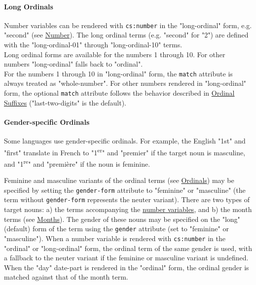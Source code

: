 \hypertarget{long-ordinals}{%
\paragraph{Long Ordinals}\label{long-ordinals}}

Number variables can be rendered with \texttt{cs:number} in the
"long-ordinal" form, e.g. "second" (see
\protect\hyperlink{number}{Number}). The long ordinal terms (e.g.
"second" for "2") are defined with the "long-ordinal-01" through
"long-ordinal-10" terms.\\
Long ordinal forms are available for the numbers 1 through 10. For other
numbers "long-ordinal" falls back to "ordinal".\\
For the numbers 1 through 10 in "long-ordinal" form, the \texttt{match}
attribute is always treated as "whole-number". For other numbers
rendered in "long-ordinal" form, the optional \texttt{match} attribute
follows the behavior described in
\protect\hyperlink{ordinal-suffixes}{Ordinal Suffixes}
("last-two-digits" is the default).

\hypertarget{gender-specific-ordinals}{%
\paragraph{Gender-specific Ordinals}\label{gender-specific-ordinals}}

Some languages use gender-specific ordinals. For example, the English
"1st" and "first" translate in French to "1\textsuperscript{er}" and
"premier" if the target noun is masculine, and "1\textsuperscript{re}"
and "première" if the noun is feminine.

Feminine and masculine variants of the ordinal terms (see
\protect\hyperlink{ordinals}{Ordinals}) may be specified by setting the
\texttt{gender-form} attribute to "feminine" or "masculine" (the term
without \texttt{gender-form} represents the neuter variant). There are
two types of target nouns: a) the terms accompanying the
\protect\hyperlink{number-variables}{number variables}, and b) the month
terms (see \protect\hyperlink{months}{Months}). The gender of these
nouns may be specified on the "long" (default) form of the term using
the \texttt{gender} attribute (set to "feminine" or "masculine"). When a
number variable is rendered with \texttt{cs:number} in the "ordinal" or
"long-ordinal" form, the ordinal term of the same gender is used, with a
fallback to the neuter variant if the feminine or masculine variant is
undefined. When the "day" date-part is rendered in the "ordinal" form,
the ordinal gender is matched against that of the month term.

